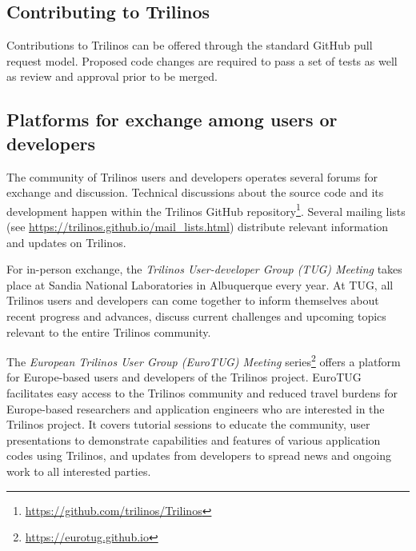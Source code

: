 


\subsection{Contributing to Trilinos}

Contributions to Trilinos can be offered through the standard GitHub pull request model.
Proposed code changes are required to pass a set of tests as well as review and approval prior to be merged.

\subsection{Platforms for exchange among users or developers}

The community of Trilinos users and developers operates several forums for exchange and discussion.
Technical discussions about the source code and its development happen within the Trilinos GitHub repository\footnote{\url{https://github.com/trilinos/Trilinos}}.
Several mailing lists (see \url{https://trilinos.github.io/mail_lists.html}) distribute relevant information and updates on Trilinos.

For in-person exchange, the \emph{Trilinos User-developer Group (TUG) Meeting} takes place at Sandia National Laboratories in Albuquerque every year.
At TUG, all Trilinos users and developers can come together to inform themselves about recent progress and advances,
discuss current challenges and upcoming topics relevant to the entire Trilinos community.

The \emph{European Trilinos User Group (EuroTUG) Meeting} series\footnote{\url{https://eurotug.github.io}}
offers a platform for Europe-based users and developers of the Trilinos project.
EuroTUG facilitates easy access to the Trilinos community and reduced travel burdens for Europe-based researchers and application engineers
who are interested in the Trilinos project.
It covers tutorial sessions to educate the community,
user presentations to demonstrate capabilities and features of various application codes using Trilinos,
and updates from developers to spread news and ongoing work to all interested parties.
